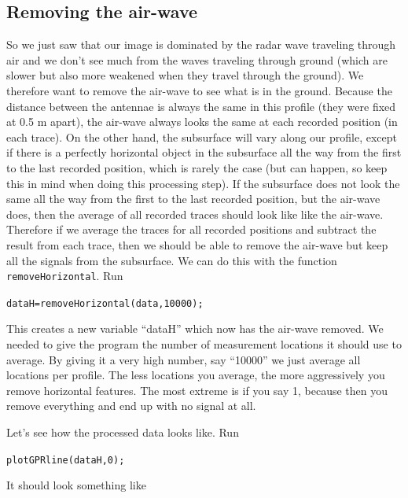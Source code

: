 \documentclass[11pt]{article}
\begin{document}
\subsection{Removing the air-wave}

So we just saw that our image is dominated by the radar wave traveling
through air and we don't see much from the waves traveling through
ground (which are slower but also more weakened when they travel
through the ground). We therefore want to remove the air-wave to see
what is in the ground. Because the distance between the antennae is
always the same in this profile (they were fixed at 0.5 m apart), the
air-wave always looks the same at each recorded position (in each
trace). On the other hand, the subsurface will vary along our profile,
except if there is a perfectly horizontal object in the subsurface all
the way from the first to the last recorded position, which is rarely
the case (but can happen, so keep this in mind when doing this
processing step). If the subsurface does not look the same all the way
from the first to the last recorded position, but the air-wave does,
then the average of all recorded traces should look like like the
air-wave. Therefore if we average the traces for all recorded
positions and subtract the result from each trace, then we should be
able to remove the air-wave but keep all the signals from the
subsurface. We can do this with the function
\verb#removeHorizontal#. Run

\qquad\verb#dataH=removeHorizontal(data,10000);#

This creates a new variable ``dataH'' which now has the air-wave
removed. We needed to give the program the number of measurement
locations it should use to average. By giving it a very high number,
say ``10000'' we just average all locations per profile. The less
locations you average, the more aggressively you remove horizontal
features. The most extreme is if you say 1, because then you remove
everything and end up with no signal at all.

Let's see how the processed data looks like. Run

\qquad \verb#plotGPRline(dataH,0);#

\clearpage
It should look something like
\end{document}
